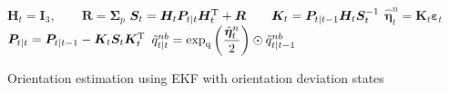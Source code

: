 \begin{algorithm}[H]
{		$ \bm{H} _{t}   =   \bm{I} _{3} %
		,   \qquad   \bm{R}   =   \bm{\Sigma} _{p} $ \; %
		$ \bm{S} _{t}  =  \bm{H} _{t}  \bm{P} _{t | t}  \bm{H} _{t} ^\text{T}  + \bm{R}   \qquad   \bm{K} _{t}   =   \bm{P} _{t | t-1} \bm{H} _{t} \bm{S} ^{-1} _{t} $ \;
		$ \hat{ \bm{\eta} } ^{n} _{t}   =   \bm{K} _{t}   \bm{\varepsilon} _{t} $ 
		$ \bm{P} _{t | t}  =  \bm{P} _{t | t-1}   -   \bm{K} _{t} \bm{S} _{t} \bm{K} _{t} ^\text{T} $ 
		$ \tilde{q} ^{nb} _{t | t}  =  \exp _\text{q} \left( \dfrac { \hat{ \bm{\eta} } ^{n} _{t} } {2} \right)  \odot  \tilde{q} ^{nb} _{t | t-1} $ \;
	} %
	\caption{Orientation estimation using EKF with orientation deviation states \cite{kok2017} }  \label{alg:dq-pose-err2}
\end{algorithm}

